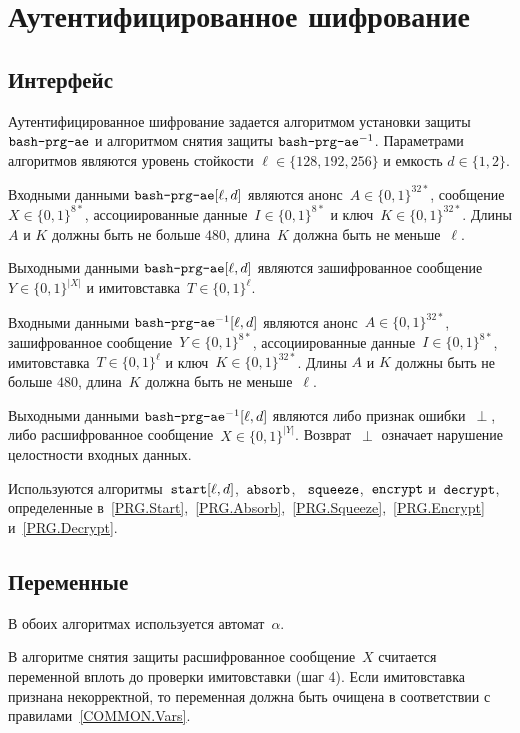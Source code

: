 \section{Аутентифицированное шифрование}\label{PRG.AE}

\subsection{Интерфейс}\label{PRG.AE.IFace}

Аутентифицированное шифрование задается алгоритмом установки 
защиты $\texttt{bash-prg-ae}$ и алгоритмом снятия защиты
$\texttt{bash-prg-ae}^{-1}$. Параметрами алгоритмов являются 
уровень стойкости $\ell\in\{128,192,256\}$ и емкость $d\in\{1,2\}$. 

Входными данными $\texttt{bash-prg-ae}[\ell,d]$ являются 
анонс~$A\in\{0,1\}^{32*}$, сообщение~$X\in\{0,1\}^{8*}$, ассоциированные
данные~$I\in\{0,1\}^{8*}$ и ключ~$K\in\{0,1\}^{32*}$.
%
Длины $A$ и $K$ должны быть не больше $480$, длина~$K$ должна быть не 
меньше~$\ell$.

Выходными данными $\texttt{bash-prg-ae}[\ell,d]$ являются 
зашифрованное сообщение~$Y\in\{0,1\}^{|X|}$ и имитовставка~$T\in\{0,1\}^\ell$.

Входными данными $\texttt{bash-prg-ae}^{-1}[\ell,d]$ являются 
анонс~$A\in\{0,1\}^{32*}$, зашифрованное сообщение~$Y\in\{0,1\}^{8*}$, 
ассоциированные данные~$I\in\{0,1\}^{8*}$, имитовставка~$T\in\{0,1\}^\ell$ 
и ключ~$K\in\{0,1\}^{32*}$.
%
Длины $A$ и $K$ должны быть не больше $480$, длина~$K$ должна быть не 
меньше~$\ell$.

Выходными данными $\texttt{bash-prg-ae}^{-1}[\ell,d]$ являются 
либо признак ошибки~$\perp$, либо расшифрованное сообщение~$X\in\{0,1\}^{|Y|}$. 
%
Возврат~$\perp$ означает нарушение целостности входных данных.

Используются алгоритмы~$\texttt{start}[\ell,d]$,~$\texttt{absorb}$,
~$\texttt{squeeze}$,~$\texttt{encrypt}$ и~$\texttt{decrypt}$, определенные 
в~\ref{PRG.Start},~\ref{PRG.Absorb},~\ref{PRG.Squeeze},~\ref{PRG.Encrypt} и~\ref{PRG.Decrypt}.

\subsection{Переменные}\label{PRG.AE.Vars}

В обоих алгоритмах используется автомат~$\alpha$.

В алгоритме снятия защиты расшифрованное сообщение~$X$
считается переменной вплоть до проверки имитовставки (шаг 4).
Если имитовставка признана некорректной, то переменная должна быть 
очищена в соответствии с правилами~\ref{COMMON.Vars}.

